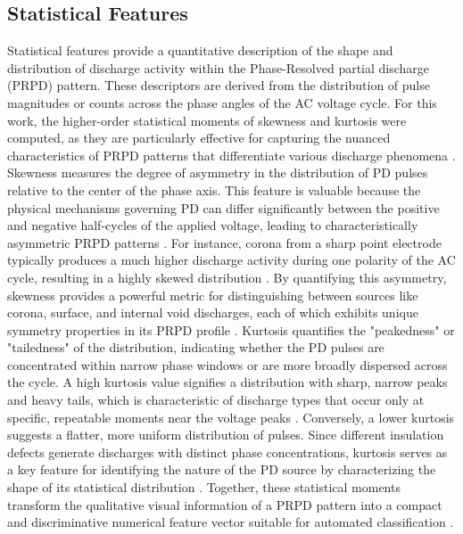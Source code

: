 \subsection{Statistical Features}

Statistical features provide a quantitative description of the shape and distribution of discharge activity within the Phase-Resolved partial discharge (PRPD) pattern. These descriptors are derived from the distribution of pulse magnitudes or counts across the phase angles of the AC voltage cycle. For this work, the higher-order statistical moments of skewness and kurtosis were computed, as they are particularly effective for capturing the nuanced characteristics of PRPD patterns that differentiate various discharge phenomena \parencite{Boczar_2017}. Skewness measures the degree of asymmetry in the distribution of PD pulses relative to the center of the phase axis. This feature is valuable because the physical mechanisms governing PD can differ significantly between the positive and negative half-cycles of the applied voltage, leading to characteristically asymmetric PRPD patterns \parencite{Boczar_2017}. For instance, corona from a sharp point electrode typically produces a much higher discharge activity during one polarity of the AC cycle, resulting in a highly skewed distribution \parencite{Yao_2016}. By quantifying this asymmetry, skewness provides a powerful metric for distinguishing between sources like corona, surface, and internal void discharges, each of which exhibits unique symmetry properties in its PRPD profile \parencite{Bohari_2021_1}. Kurtosis quantifies the "peakedness" or "tailedness" of the distribution, indicating whether the PD pulses are concentrated within narrow phase windows or are more broadly dispersed across the cycle. A high kurtosis value signifies a distribution with sharp, narrow peaks and heavy tails, which is characteristic of discharge types that occur only at specific, repeatable moments near the voltage peaks \parencite{Boczar_2017}. Conversely, a lower kurtosis suggests a flatter, more uniform distribution of pulses. Since different insulation defects generate discharges with distinct phase concentrations, kurtosis serves as a key feature for identifying the nature of the PD source by characterizing the shape of its statistical distribution \parencite{Kunicki_2018}. Together, these statistical moments transform the qualitative visual information of a PRPD pattern into a compact and discriminative numerical feature vector suitable for automated classification \parencite{Bohari_2021_1}.

